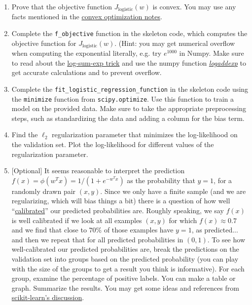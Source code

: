 \documentclass{article}
\theoremstyle{plain}
\theoremstyle{definition}
\begin{document}
\begin{enumerate}
  \setcounter{enumi}{\value{saveenum}}
\item Prove that the objective function $J_{\text{logistic}}(w)$ is convex.
You may use any facts mentioned in the \href{https://davidrosenberg.github.io/mlcourse/Notes/convex-optimization.pdf}{convex optimization notes}.

\item Complete the \texttt{f\_objective} function in the skeleton code,
which computes the objective function for $J_{\text{logistic}}(w)$.
(Hint: you may get numerical overflow when computing the exponential literally,
e.g. try $e^{1000}$ in Numpy.
Make sure to read about the
\href{https://blog.feedly.com/tricks-of-the-trade-logsumexp/}{log-sum-exp trick}
and use the numpy function
\textit{ \href{https://docs.scipy.org/doc/numpy/reference/generated/numpy.logaddexp.html}{logaddexp}
}
to get accurate calculations
and to prevent overflow.

\item Complete the \texttt{fit\_logistic\_regression\_function} in the skeleton
code using the \texttt{minimize} function from \texttt{scipy.optimize}.
Use this function to train
a model on the provided data. Make sure to take the appropriate preprocessing
steps, such as standardizing the data and adding a column for the
bias term. 

\item Find the $\ell_{2}$ regularization parameter that minimizes the log-likelihood
on the validation set. Plot the log-likelihood for different values
of the regularization parameter. 

\item {[}Optional{]} 
It seems reasonable to interpret the prediction $f(x)=\phi(w^{T}x)=1/(1+e^{-w^{T}x})$
as the probability that $y=1$, for a randomly drawn pair $\left(x,y\right)$.
Since we only have a finite sample (and we are regularizing, which
will bias things a bit) there is a question of how well ``\href{https://en.wikipedia.org/wiki/Calibration_(statistics)}{calibrated}''
our predicted probabilities are. Roughly speaking, we say $f(x)$
is well calibrated if we look at all examples $\left(x,y\right)$
for which $f(x)\approx0.7$ and we find that close to $70\%$ of those
examples have $y=1$, as predicted... and then we repeat that for
all predicted probabilities in $\left(0,1\right)$. To see how well-calibrated
our predicted probabilities are, break the predictions on the validation
set into groups based on the predicted probability (you can play with
the size of the groups to get a result you think is informative).
For each group, examine the percentage of positive labels. You can
make a table or graph. Summarize the results. You may get some ideas
and references from \href{http://scikit-learn.org/stable/modules/calibration.html}{scikit-learn's discussion}. 
\setcounter{saveenum}{\value{enumi}}
\end{enumerate}
\end{document}
